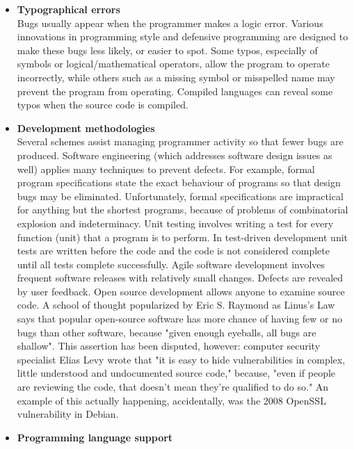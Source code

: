 \begin{itemize}
\item \textbf{Typographical errors}\\
Bugs usually appear when the programmer makes a logic error. Various innovations in programming style and defensive programming are designed to make these bugs less likely, or easier to spot. Some typos, especially of symbols or logical/mathematical operators, allow the program to operate incorrectly, while others such as a missing symbol or misspelled name may prevent the program from operating. Compiled languages can reveal some typos when the source code is compiled.\\
\item \textbf{Development methodologies}\\
Several schemes assist managing programmer activity so that fewer bugs are produced. Software engineering (which addresses software design issues as well) applies many techniques to prevent defects. For example, formal program specifications state the exact behaviour of programs so that design bugs may be eliminated. Unfortunately, formal specifications are impractical for anything but the shortest programs, because of problems of combinatorial explosion and indeterminacy.
Unit testing involves writing a test for every function (unit) that a program is to perform.
In test-driven development unit tests are written before the code and the code is not considered complete until all tests complete successfully.
Agile software development involves frequent software releases with relatively small changes. Defects are revealed by user feedback.
Open source development allows anyone to examine source code. A school of thought popularized by Eric S. Raymond as Linus's Law says that popular open-source software has more chance of having few or no bugs than other software, because "given enough eyeballs, all bugs are shallow". This assertion has been disputed, however: computer security specialist Elias Levy wrote that "it is easy to hide vulnerabilities in complex, little understood and undocumented source code," because, "even if people are reviewing the code, that doesn't mean they're qualified to do so." An example of this actually happening, accidentally, was the 2008 OpenSSL vulnerability in Debian.\\
\item \textbf{Programming language support}\\

\end{itemize}
